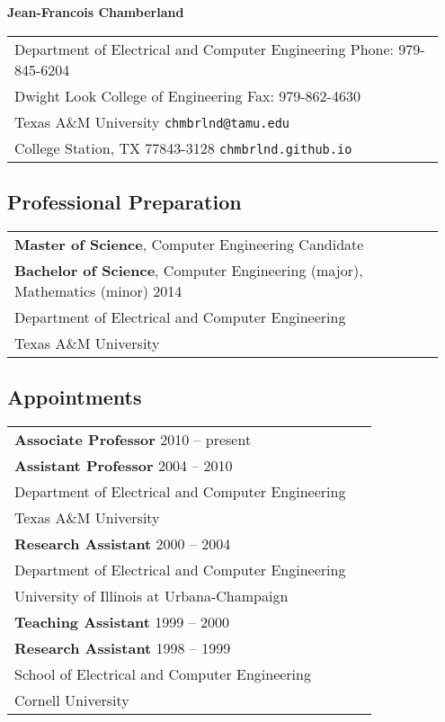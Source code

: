 \documentclass[11pt]{article}
\begin{document}
\begin{center}
{\bfseries \Large Jean-Francois Chamberland}
\end{center}

\begin{center}
\begin{tabular}{p{0.95\linewidth}}
Department of Electrical and Computer Engineering
\hfill Phone: 979-845-6204 \\
Dwight Look College of Engineering
\hfill Fax: 979-862-4630 \\
Texas A\&M University
\hfill \texttt{chmbrlnd@tamu.edu} \\
College Station, TX 77843-3128
\hfill \texttt{chmbrlnd.github.io}
\end{tabular}
\end{center}


\subsection*{Professional Preparation}

\begin{center}
\begin{tabular}{p{0.95\linewidth}}
\textbf{Master of Science}, Computer Engineering \hfill Candidate \\
\textbf{Bachelor of Science}, Computer Engineering (major), Mathematics (minor) \hfill 2014 \\
Department of Electrical and Computer Engineering \\
Texas A\&M University
\end{tabular}
\end{center}


\subsection*{Appointments}

\begin{center}
\begin{tabular}{p{0.95\linewidth}}
\textbf{Associate Professor} \hfill 2010 -- present \\
\textbf{Assistant Professor} \hfill 2004 -- 2010 \\
Department of Electrical and Computer Engineering \\
Texas A\&M University \\[4pt]
\textbf{Research Assistant} \hfill 2000 -- 2004 \\
Department of Electrical and Computer Engineering \\
University of Illinois at Urbana-Champaign \\[4pt]
\textbf{Teaching Assistant} \hfill 1999 -- 2000 \\
\textbf{Research Assistant} \hfill 1998 -- 1999 \\
School of Electrical and Computer Engineering \\
Cornell University
\end{tabular}
\end{center}
\end{document}
